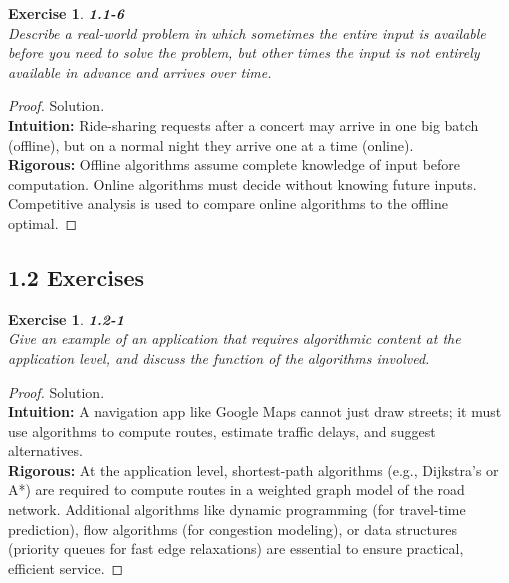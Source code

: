 \documentclass[12pt]{article}
\newtheorem{exercise}[theorem]{Exercise}
\theoremstyle{definition}
\begin{document}
\begin{exercise}
\noindent
\textbf{1.1-6}\\
\noindent
Describe a real-world problem in which sometimes the entire input is
available before you need to solve the problem, but other times the input is
not entirely available in advance and arrives over time.
\end{exercise}

\vspace{1pt}

\begin{proof}
Solution.\\

\noindent
\textbf{Intuition:} Ride-sharing requests after a concert may arrive in one big
batch (offline), but on a normal night they arrive one at a time (online).\\

\noindent
\textbf{Rigorous:} Offline algorithms assume complete knowledge of input
before computation. Online algorithms must decide without knowing
future inputs. Competitive analysis is used to compare online algorithms to
the offline optimal.
\end{proof}


\dotfill
\newpage

\subsection*{1.2 Exercises}

\begin{exercise}
\noindent
\textbf{1.2-1}\\
\noindent
Give an example of an application that requires algorithmic content at the
application level, and discuss the function of the algorithms involved.
\end{exercise}

\vspace{1pt}

\begin{proof}
Solution.\\

\noindent
\textbf{Intuition:} A navigation app like Google Maps cannot just draw streets;
it must use algorithms to compute routes, estimate traffic delays, and suggest
alternatives.\\

\noindent
\textbf{Rigorous:} At the application level, shortest-path algorithms (e.g.,
Dijkstra’s or A*) are required to compute routes in a weighted graph model
of the road network. Additional algorithms like dynamic programming (for
travel-time prediction), flow algorithms (for congestion modeling), or data
structures (priority queues for fast edge relaxations) are essential to ensure
practical, efficient service.
\end{proof}
\end{document}
